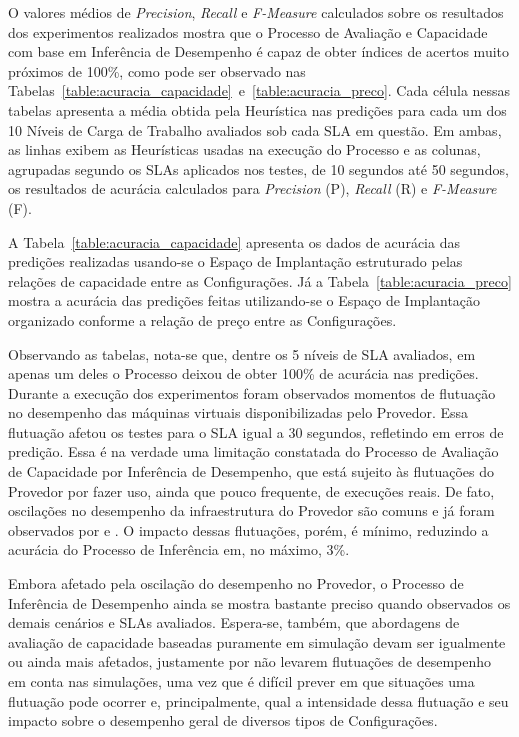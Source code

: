 O valores médios de \emph{Precision}, \emph{Recall} e \emph{F-Measure}
calculados sobre os resultados dos experimentos realizados mostra que o Processo de Avaliação e Capacidade com base em Inferência de Desempenho é capaz de obter índices de acertos muito próximos de 100\%, como 
pode ser observado nas Tabelas~\ref{table:acuracia_capacidade}~e~\ref{table:acuracia_preco}. Cada célula nessas tabelas apresenta a média obtida pela Heurística nas predições para cada um dos 10 Níveis de Carga de Trabalho avaliados sob cada SLA em questão. Em ambas, as linhas exibem 
as Heurísticas usadas na execução do Processo e as colunas, agrupadas segundo
os SLAs aplicados nos testes, de 10 segundos até 50 segundos, os resultados 
de acurácia calculados para \emph{Precision} (P), \emph{Recall} (R) e \emph{F-Measure} (F).

A Tabela~\ref{table:acuracia_capacidade} apresenta os dados de acurácia das 
predições realizadas usando-se o Espaço de Implantação estruturado pelas relações
de capacidade entre as Configurações. Já a Tabela~\ref{table:acuracia_preco} mostra
a acurácia das predições feitas utilizando-se o Espaço de Implantação organizado
conforme a relação de preço entre as Configurações. 

Observando as tabelas, nota-se que, dentre os 5 níveis de SLA avaliados, em apenas 
um deles o Processo deixou de obter 100\% de acurácia nas predições. Durante a
execução dos experimentos foram observados momentos de flutuação no desempenho
das máquinas virtuais disponibilizadas pelo Provedor. Essa flutuação afetou os
testes para o SLA igual a 30 segundos, refletindo em erros de predição. Essa é
na verdade uma limitação constatada do Processo de Avaliação de Capacidade por
Inferência de Desempenho, que está sujeito às flutuações do Provedor por fazer
uso, ainda que pouco frequente, de execuções reais. De fato, oscilações no 
desempenho da infraestrutura do Provedor são comuns e já foram observados por 
\cite{iosup2011performance} e \cite{cunhaavalia}. O impacto dessas flutuações, 
porém, é mínimo, reduzindo a acurácia do Processo de Inferência em, no máximo,
3\%.

Embora afetado pela oscilação do desempenho no Provedor, o Processo de Inferência
de Desempenho ainda se mostra bastante preciso quando observados os demais 
cenários e SLAs avaliados. Espera-se, também, que abordagens de avaliação de
capacidade baseadas puramente em simulação devam ser igualmente ou ainda mais 
afetados, justamente por não levarem flutuações de desempenho em conta nas 
simulações, uma vez que é difícil prever em que situações uma flutuação pode 
ocorrer e, principalmente, qual a intensidade dessa flutuação e seu impacto sobre 
o desempenho geral de diversos tipos de Configurações.   

